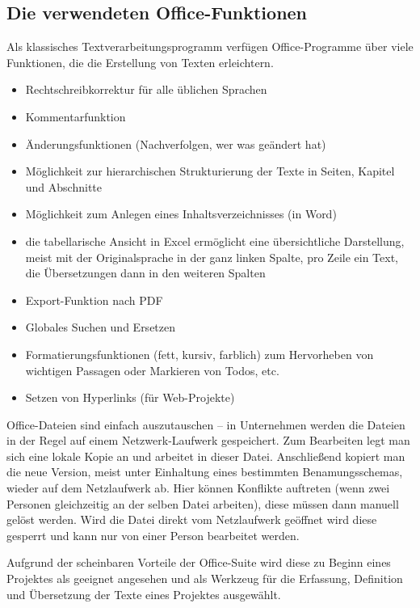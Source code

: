 \subsection{Die verwendeten Office-Funktionen}

Als klassisches Textverarbeitungsprogramm verfügen Office-Programme über viele Funktionen, die die Erstellung von Texten erleichtern.

\begin{itemize}
\item{Rechtschreibkorrektur für alle üblichen Sprachen}
\item{Kommentarfunktion}
\item{Änderungsfunktionen (Nachverfolgen, wer was geändert hat)}
\item{Möglichkeit zur hierarchischen Strukturierung der Texte in Seiten, Kapitel und Abschnitte}
\item{Möglichkeit zum Anlegen eines Inhaltsverzeichnisses (in Word)}
\item{die tabellarische Ansicht in Excel ermöglicht eine übersichtliche Darstellung, meist mit der Originalsprache in der ganz linken Spalte, pro Zeile ein Text, die Übersetzungen dann in den weiteren Spalten}
\item{Export-Funktion nach PDF}
\item{Globales Suchen und Ersetzen}
\item{Formatierungsfunktionen (fett, kursiv, farblich) zum Hervorheben von wichtigen Passagen oder Markieren von Todos, etc.}
\item{Setzen von Hyperlinks (für Web-Projekte)}
\end{itemize}

Office-Dateien sind einfach auszutauschen – in Unternehmen werden die Dateien in der Regel auf einem Netzwerk-Laufwerk gespeichert. Zum Bearbeiten legt man sich eine lokale Kopie an und arbeitet in dieser Datei. Anschließend kopiert man die neue Version, meist unter Einhaltung eines bestimmten Benamungsschemas, wieder auf dem Netzlaufwerk ab. Hier können Konflikte auftreten (wenn zwei Personen gleichzeitig an der selben Datei arbeiten), diese müssen dann manuell gelöst werden. Wird die Datei direkt vom Netzlaufwerk geöffnet wird diese gesperrt und kann nur von einer Person bearbeitet werden.

Aufgrund der scheinbaren Vorteile der Office-Suite wird diese zu Beginn eines Projektes als geeignet angesehen und als Werkzeug für die Erfassung, Definition und Übersetzung der Texte eines Projektes ausgewählt.

